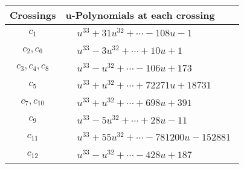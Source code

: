 \documentclass[1p]{elsarticle_modified}
\theoremstyle{definition}
\begin{document}
\begin{tabular}{m{50pt}|m{274pt}}
Crossings & \hspace{64pt}u-Polynomials at each crossing \\
\hline $$\begin{aligned}c_{1}\end{aligned}$$&$\begin{aligned}
&u^{33}+31 u^{32}+\cdots-108 u-1
\end{aligned}$\\
\hline $$\begin{aligned}c_{2},c_{6}\end{aligned}$$&$\begin{aligned}
&u^{33}-3 u^{32}+\cdots+10 u+1
\end{aligned}$\\
\hline $$\begin{aligned}c_{3},c_{4},c_{8}\end{aligned}$$&$\begin{aligned}
&u^{33}- u^{32}+\cdots-106 u+173
\end{aligned}$\\
\hline $$\begin{aligned}c_{5}\end{aligned}$$&$\begin{aligned}
&u^{33}+u^{32}+\cdots+72271 u+18731
\end{aligned}$\\
\hline $$\begin{aligned}c_{7},c_{10}\end{aligned}$$&$\begin{aligned}
&u^{33}+u^{32}+\cdots+698 u+391
\end{aligned}$\\
\hline $$\begin{aligned}c_{9}\end{aligned}$$&$\begin{aligned}
&u^{33}-5 u^{32}+\cdots+28 u-11
\end{aligned}$\\
\hline $$\begin{aligned}c_{11}\end{aligned}$$&$\begin{aligned}
&u^{33}+55 u^{32}+\cdots-781200 u-152881
\end{aligned}$\\
\hline $$\begin{aligned}c_{12}\end{aligned}$$&$\begin{aligned}
&u^{33}- u^{32}+\cdots-428 u+187
\end{aligned}$\\
\hline
\end{tabular}\\~\\
\end{document}
